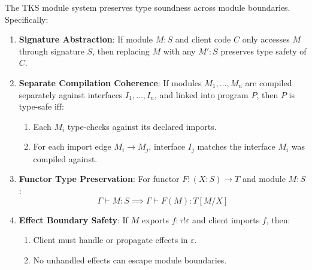 \begin{theorem}
\label{thm:module-soundness}
The TKS module system preserves type soundness across module boundaries. Specifically:

\begin{enumerate}
  \item \textbf{Signature Abstraction}: If module $M : S$ and client code $C$ only accesses $M$ through signature $S$, then replacing $M$ with any $M' : S$ preserves type safety of $C$.

  \item \textbf{Separate Compilation Coherence}: If modules $M_1, \ldots, M_n$ are compiled separately against interfaces $I_1, \ldots, I_n$, and linked into program $P$, then $P$ is type-safe iff:
  \begin{enumerate}
    \item Each $M_i$ type-checks against its declared imports.
    \item For each import edge $M_i \to M_j$, interface $I_j$ matches the interface $M_i$ was compiled against.
  \end{enumerate}

  \item \textbf{Functor Type Preservation}: For functor $F : (X : S) \to T$ and module $M : S$:
  \[
  \Gamma \vdash M : S \implies \Gamma \vdash F(M) : T[M/X]
  \]

  \item \textbf{Effect Boundary Safety}: If $M$ exports $f : \tau \mathbin{!} \varepsilon$ and client imports $f$, then:
  \begin{enumerate}
    \item Client must handle or propagate effects in $\varepsilon$.
    \item No unhandled effects can escape module boundaries.
  \end{enumerate}
\end{enumerate}
\end{theorem}


